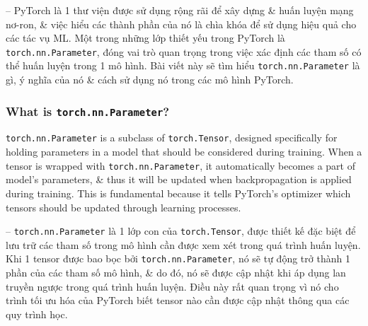 \documentclass{article}
\begin{document}
-- PyTorch là 1 thư viện được sử dụng rộng rãi để xây dựng \& huấn luyện mạng nơ-ron, \& việc hiểu các thành phần của nó là chìa khóa để sử dụng hiệu quả cho các tác vụ ML. Một trong những lớp thiết yếu trong PyTorch là {\tt torch.nn.Parameter}, đóng vai trò quan trọng trong việc xác định các tham số có thể huấn luyện trong 1 mô hình. Bài viết này sẽ tìm hiểu {\tt torch.nn.Parameter} là gì, ý nghĩa của nó \& cách sử dụng nó trong các mô hình PyTorch.


\subsubsection{What is {\tt torch.nn.Parameter}?}
{\tt torch.nn.Parameter} is a subclass of {\tt torch.Tensor}, designed specifically for holding parameters in a model that should be considered during training. When a tensor is wrapped with {\tt torch.nn.Parameter}, it automatically becomes a part of model's parameters, \& thus it will be updated when backpropagation is applied during training. This is fundamental because it tells PyTorch's optimizer which tensors should be updated through learning processes.

-- {\tt torch.nn.Parameter} là 1 lớp con của {\tt torch.Tensor}, được thiết kế đặc biệt để lưu trữ các tham số trong mô hình cần được xem xét trong quá trình huấn luyện. Khi 1 tensor được bao bọc bởi {\tt torch.nn.Parameter}, nó sẽ tự động trở thành 1 phần của các tham số mô hình, \& do đó, nó sẽ được cập nhật khi áp dụng lan truyền ngược trong quá trình huấn luyện. Điều này rất quan trọng vì nó cho trình tối ưu hóa của PyTorch biết tensor nào cần được cập nhật thông qua các quy trình học.

\end{document}
